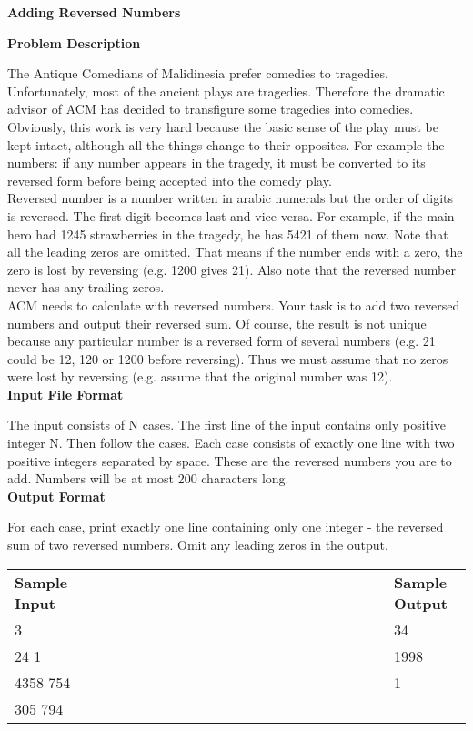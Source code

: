 \documentclass[12pt,a4paper]{article}
\begin{document}
\begin{center}
{\LARGE\textbf{Adding Reversed Numbers}}
\end{center}

{\Large\textbf{Problem Description\\}}

The Antique Comedians of Malidinesia prefer comedies to tragedies. Unfortunately, most of the ancient plays are tragedies. Therefore the dramatic advisor of ACM has decided to transfigure some tragedies into comedies. Obviously, this work is very hard because the basic sense of the play must be kept intact, although all the things change to their opposites. For example the numbers: if any number appears in the tragedy, it must be converted to its reversed form before being accepted into the comedy play.\\

Reversed number is a number written in arabic numerals but the order of digits is reversed. The first digit becomes last and vice versa. For example, if the main hero had 1245 strawberries in the tragedy, he has 5421 of them now. Note that all the leading zeros are omitted. That means if the number ends with a zero, the zero is lost by reversing (e.g. 1200 gives 21). Also note that the reversed number never has any trailing zeros.\\

ACM needs to calculate with reversed numbers. Your task is to add two reversed numbers and output their reversed sum. Of course, the result is not unique because any particular number is a reversed form of several numbers (e.g. 21 could be 12, 120 or 1200 before reversing). Thus we must assume that no zeros were lost by reversing (e.g. assume that the original number was 12).\\

{\Large\textbf{Input File Format\\}}

The input consists of N cases. The first line of the input contains only positive integer N. Then follow the cases. Each case consists of exactly one line with two positive integers separated by space. These are the reversed numbers you are to add. Numbers will be at most 200 characters long.\\

{\Large\textbf{Output Format\\}}

For each case, print exactly one line containing only one integer - the reversed sum of two reversed numbers. Omit any leading zeros in the output.\\

\begin{tabular}{ll}
{\Large\textbf{Sample Input}}~~~~~~~~~~~~~~~~~~~~~~~~~~~~~~~~~~~~~~~~~~~&
{\Large\textbf{Sample Output}}\\
3&34\\
24 1&1998\\
4358 754&1\\
305 794\\
\end{tabular}
\end{document}
